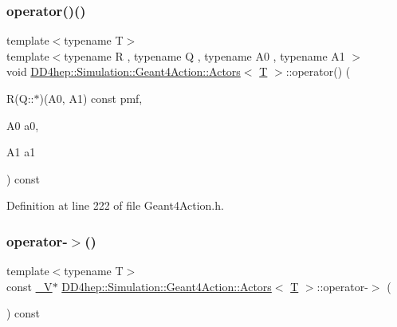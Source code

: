 \subsubsection{\texorpdfstring{operator()()}{operator()()}\hspace{0.1cm}{\footnotesize\ttfamily [6/6]}}
{\footnotesize\ttfamily template$<$typename T$>$ \\
template$<$typename R , typename Q , typename A0 , typename A1 $>$ \\
void \hyperlink{class_d_d4hep_1_1_simulation_1_1_geant4_action_1_1_actors}{D\+D4hep\+::\+Simulation\+::\+Geant4\+Action\+::\+Actors}$<$ \hyperlink{class_t}{T} $>$\+::operator() (\begin{DoxyParamCaption}\item[{R(Q\+::$\ast$)(A0, A1) const}]{pmf,  }\item[{A0}]{a0,  }\item[{A1}]{a1 }\end{DoxyParamCaption}) const\hspace{0.3cm}{\ttfamily [inline]}}



Definition at line 222 of file Geant4\+Action.\+h.

\hypertarget{class_d_d4hep_1_1_simulation_1_1_geant4_action_1_1_actors_a32462af31dbdab612359f8039941882f}{}\label{class_d_d4hep_1_1_simulation_1_1_geant4_action_1_1_actors_a32462af31dbdab612359f8039941882f} 
\subsubsection{\texorpdfstring{operator-\/$>$()}{operator->()}\hspace{0.1cm}{\footnotesize\ttfamily [1/2]}}
{\footnotesize\ttfamily template$<$typename T$>$ \\
const \hyperlink{class_d_d4hep_1_1_simulation_1_1_geant4_action_1_1_actors_a18b6dfb1542a2cd036d8317db48f6c16}{\+\_\+V}$\ast$ \hyperlink{class_d_d4hep_1_1_simulation_1_1_geant4_action_1_1_actors}{D\+D4hep\+::\+Simulation\+::\+Geant4\+Action\+::\+Actors}$<$ \hyperlink{class_t}{T} $>$\+::operator-\/$>$ (\begin{DoxyParamCaption}{ }\end{DoxyParamCaption}) const\hspace{0.3cm}{\ttfamily [inline]}}




